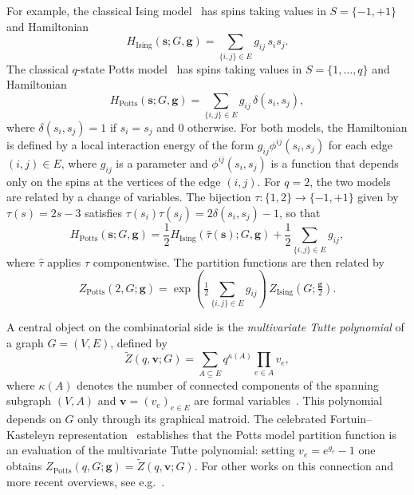 \documentclass[11pt,reqno]{amsart}
\newcommand{\vecs}{\boldsymbol{s}}
\newcommand{\vecv}{\boldsymbol{v}}
\newcommand{\vecg}{\boldsymbol{g}}
\theoremstyle{plain}
\theoremstyle{definition}
\numberwithin{equation}{section}
\begin{document}
For example, the classical Ising model~\cite{LenzBeitragZV, isingBeitragZurTheorie1925} has spins taking values in $S = \{-1, +1\}$ and Hamiltonian
\[
H_{\mathrm{Ising}}(\vecs; G, \vecg) = \sum_{\{i,j\} \in E} g_{ij}\, s_i s_j.
\]
The classical $q$-state Potts model~\cite{wu1982potts} has spins taking values in $S = \{1, \dots, q\}$ and Hamiltonian
\[
H_{\mathrm{Potts}}(\vecs; G, \vecg) = \sum_{\{i,j\} \in E} g_{ij}\, \delta(s_i, s_j),
\]
where $\delta(s_i, s_j) = 1$ if $s_i = s_j$ and $0$ otherwise. For both models, the Hamiltonian is defined by a local interaction energy of the form $g_{ij} \phi^{ij}(s_i,s_j)$ for each edge $(i,j)\in E$, where $g_{ij}$ is a parameter and $\phi^{ij}(s_i,s_j)$ is a function that depends only on the spins at the vertices of the edge $(i,j)$.
For $q = 2$, the two models are related by a change of variables. The bijection $\tau \colon \{1,2\} \to \{-1,+1\}$ given by $\tau(s) = 2s - 3$ satisfies $\tau(s_i)\tau(s_j) = 2\delta(s_i, s_j) - 1$, so that
\[
H_{\mathrm{Potts}}(\vecs; G, \vecg) = \frac{1}{2} H_{\mathrm{Ising}}(\hat{\tau}(\vecs); G, \vecg) + \frac{1}{2}\sum_{\{i,j\} \in E} g_{ij},
\]
where $\hat{\tau}$ applies $\tau$ componentwise. The partition functions are then related by
\begin{equation}
\label{eq:introequiv}
Z_{\mathrm{Potts}}(2, G; \vecg) = \exp\!\left(\tfrac{1}{2}\textstyle\sum_{\{i,j\} \in E} g_{ij}\right)\, Z_{\mathrm{Ising}}\!\left(G; \tfrac{\vecg}{2}\right).
\end{equation}

A central object on the combinatorial side is the \emph{multivariate Tutte polynomial} of a graph $G = (V,E)$, defined by
\[
\widetilde{Z}(q, \vecv; G) = \sum_{A \subseteq E} q^{\kappa(A)} \prod_{e \in A} v_e,
\]
where $\kappa(A)$ denotes the number of connected components of the spanning subgraph $(V,A)$ and $\vecv = (v_e)_{e \in E}$ are formal variables~\cite{Sok05}. This polynomial depends on $G$ only through its graphical matroid. The celebrated Fortuin--Kasteleyn representation~\cite{FK72} establishes that the Potts model partition function is an evaluation of the multivariate Tutte polynomial: setting $v_e = e^{g_e} - 1$ one obtains $Z_{\mathrm{Potts}}(q, G; \vecg) = \widetilde{Z}(q, \vecv; G)$. For other works on this connection and more recent overviews, see e.g.~\cite{Bax82, beaudin2010little, Big93, Bol98, Loe10, Tut84, Wel93, WM00, Sok05}.
\end{document}
